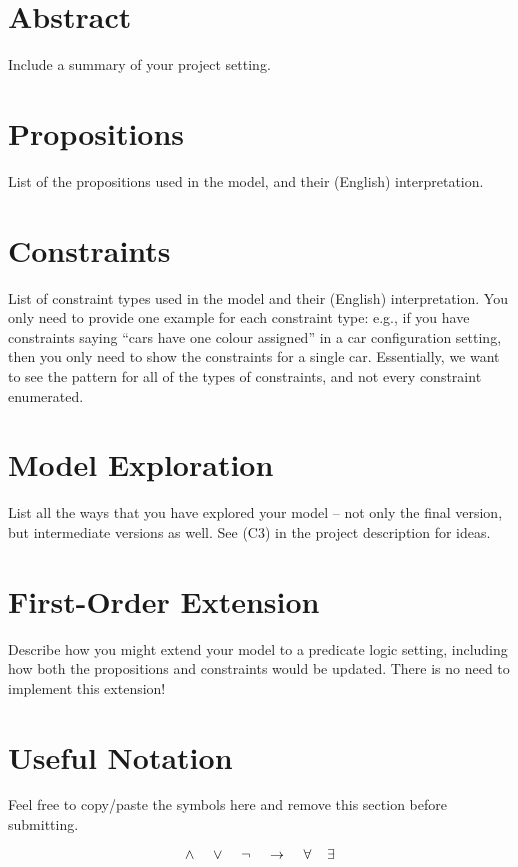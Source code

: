 \documentclass[pdftex,10pt,a4paper]{article}
\numberwithin{equation}{section} %
\begin{document}



\section*{Abstract}
Include a summary of your project setting.


\section*{Propositions}
List of the propositions used in the model, and their (English) interpretation.


\section*{Constraints}
List of constraint types used in the model and their (English) interpretation. You only need to provide one example for each constraint type: e.g., if you have constraints saying “cars have one colour assigned” in a car configuration setting, then you only need to show the constraints for a single car. Essentially, we want to see the pattern for all of the types of constraints, and not every constraint enumerated.


\section*{Model Exploration}
List all the ways that you have explored your model – not only the final version, but intermediate versions as well. See (C3) in the project description for ideas.


\section*{First-Order Extension}
Describe how you might extend your model to a predicate logic setting, including how both the propositions and constraints would be updated. There is no need to implement this extension!


\section*{Useful Notation}
Feel free to copy/paste the symbols here and remove this section before submitting.

\[ \wedge \hspace{4mm} \vee \hspace{4mm} \neg \hspace{4mm} \rightarrow \hspace{4mm} \forall \hspace{4mm} \exists \]
\end{document}
